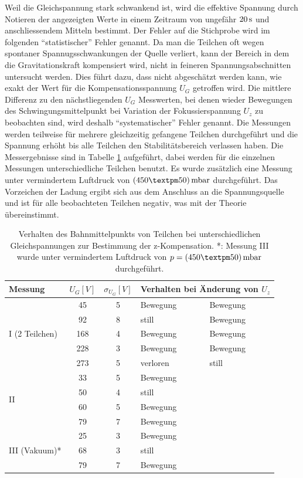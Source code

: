 \documentclass[a4paper,12pt]{article}
\begin{document}
Weil die Gleichspannung stark schwankend ist, wird die effektive Spannung durch Notieren der angezeigten Werte in einem Zeitraum von ungefähr $\unit[20]{s}$ und anschliessendem Mitteln bestimmt. 
Der Fehler auf die Stichprobe wird im folgenden "`statistischer"' Fehler genannt.
Da man die Teilchen oft wegen spontaner Spannugsschwankungen der Quelle verliert, kann der Bereich in dem die Gravitationskraft kompensiert wird, nicht in feineren Spannungsabschnitten untersucht werden.
Dies führt dazu, dass nicht abgeschätzt werden kann, wie exakt der Wert für die Kompensationsspannung $U_G$ getroffen wird.
Die mittlere Differenz zu den nächstliegenden $U_G$ Messwerten, bei denen wieder Bewegungen des Schwingungsmittelpunkt bei Variation der Fokussierspannung $U_z$ zu beobachten sind,
wird deshalb "`systematischer"' Fehler genannt.
Die Messungen werden teilweise für mehrere gleichzeitig gefangene Teilchen durchgeführt und die Spannung erhöht bis alle Teilchen den Stabilitätsbereich verlassen haben. Die Messergebnisse sind in
Tabelle \ref{tab:z-komp-measure} aufgeführt, dabei werden für die einzelnen Messungen unterschiedliche Teilchen benutzt. Es wurde zusätzlich eine Messung unter vermindertem Luftdruck von
 $\unit[(450±50)]{mbar}$ durchgeführt.
Das Vorzeichen der Ladung ergibt sich aus dem Anschluss an die Spannungsquelle und ist für alle beobachteten Teilchen negativ, was mit der Theorie übereinstimmt.

\begin{table}[h]
	\centering
	\begin{tabular}{ l|c | c | l | l }
		Messung  & $U_{G} [V]$ & $\sigma_{U_{G}}[V]$ & \multicolumn{2}{l}{Verhalten bei Änderung von $U_z$}\\
		\hline
		\hline
		\multirow{5}{*}{I (2 Teilchen)}&45 & 5 & Bewegung &  Bewegung   \\
		&92 & 8 & still  & Bewegung \\
		&168 & 4 & Bewegung & Bewegung    \\
		&228 & 3 & Bewegung & Bewegung \\
		&273 & 5 & verloren & still \\
		\hline
		\multirow{4}{*}{II}&33 & 5 & Bewegung \\
		&50 & 4 & still\\
		&60 & 5 & Bewegung \\
		&79 & 7 & Bewegung\\
		\hline
		\multirow{3}{*}{III (Vakuum)*}&25 & 3 & Bewegung\\
		&68 & 3 & still\\
		&79 & 7 & Bewegung\\
	\end{tabular}
	\caption{Verhalten des Bahnmittelpunkts von Teilchen  bei unterschiedlichen Gleichspannungen zur Bestimmung der z-Kompensation.\newline
		*: Messung III wurde unter vermindertem Luftdruck von $p = \unit[(450±50)]{mbar}$ durchgeführt.
	}
	\label{tab:z-komp-measure}
\end{table}
\end{document}
